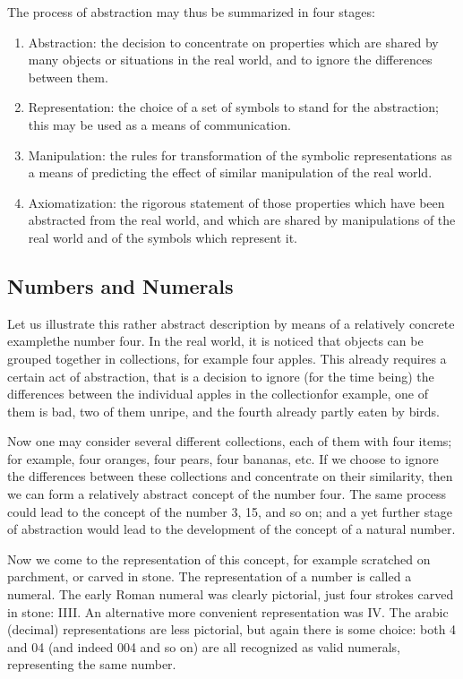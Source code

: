 \documentclass[twoside,11pt]{book}
\begin{document}
The process of abstraction may thus be summarized in four stages:

\begin{enumerate}[wide, nosep, label=(\arabic*)]
	\item Abstraction: the decision to concentrate on properties which are shared  by many objects or situations in the real world, and to ignore the differences between them.
	\item Representation: the choice of a set of symbols to stand for the abstraction; this may be used as a means of communication.
	\item Manipulation: the rules for transformation of the symbolic representations as a means of predicting the effect of similar manipulation of the real world.
	\item Axiomatization: the rigorous statement of those properties which have been abstracted from the real world, and which are shared by manipulations of the real world and of the symbols which represent it.
\end{enumerate}

\subsection{Numbers and Numerals}
Let us illustrate this rather abstract description by means of a relatively concrete example\textemdash{}the number four. In the real world, it is noticed that objects can be grouped together in collections, for example four apples. This already requires a certain act of abstraction, that is a decision to ignore (for the time being) the differences between the individual apples in the collection\textemdash{}for example, one of them is bad, two of them unripe, and the fourth already partly eaten by birds.

Now one may consider several different collections, each of them with four items; for example, four oranges, four pears, four bananas, etc. If we choose to ignore the differences between these collections and concentrate on their similarity, then we can form a relatively abstract concept of the number four. The same process could lead to the concept of the number 3, 15, and so on; and a yet further stage of abstraction would lead to the development of the concept of a natural number.

Now we come to the representation of this concept, for example scratched on parchment, or carved in stone. The representation of a number is called a numeral. The early Roman numeral was clearly pictorial, just four strokes carved in stone: IIII. An alternative more convenient representation was IV. The arabic (decimal) representations are less pictorial, but again there is some choice: both 4 and 04 (and indeed 004 and so on) are all recognized as valid numerals, representing the same number.
\end{document}
